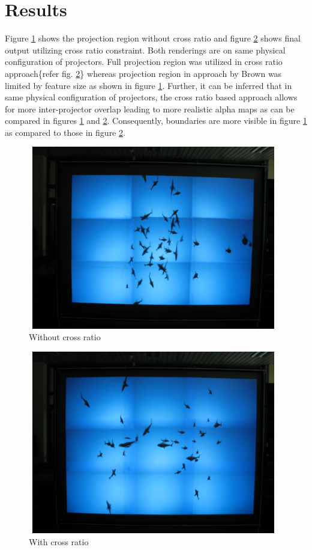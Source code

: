 \documentclass{article}
\begin{document}
   

\section{Results}
Figure \ref{non_cross_rat} shows the projection region without cross ratio and figure \ref{cross_rat} shows final output utilizing cross ratio constraint. Both renderings are on same physical configuration of projectors. Full projection region was utilized in cross ratio approach\{refer fig. \ref{cross_rat}\} whereas projection region in approach by Brown\cite{1} was limited by feature size as shown in figure \ref{non_cross_rat}. \newline 
Further, it can be inferred that in same physical configuration of projectors, the cross ratio based approach allows for more inter-projector overlap leading to more realistic alpha maps as can be compared in figures \ref{non_cross_rat} and \ref{cross_rat}. Consequently, boundaries are more visible in figure \ref{non_cross_rat} as compared to those in figure \ref{cross_rat}.

\begin{figure}
\includegraphics[width=11cm,height=8cm]{figures/without_cross_rat.jpg}
\caption{Without cross ratio}
\label{non_cross_rat}
\end{figure}


\begin{figure}
\includegraphics[width=11cm,height=8cm]{figures/with_cross_rat.jpg}
\caption{With cross ratio}
\label{cross_rat}
\end{figure}
\end{document}
